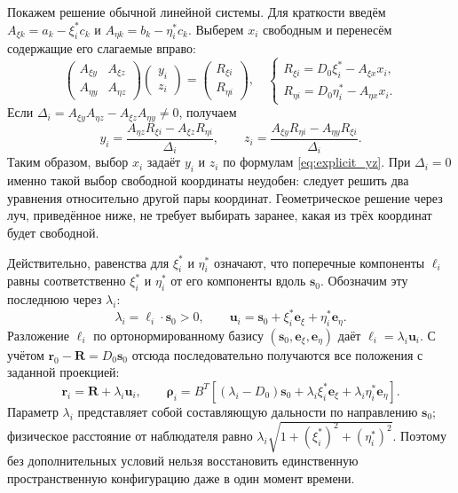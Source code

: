 \documentclass[a4paper,12pt]{article}
\begin{document}
Покажем решение обычной линейной системы. Для краткости введём $A_{\xi k}=a_k-\xi_i^*c_k$ и $A_{\eta k}=b_k-\eta_i^*c_k$. Выберем $x_i$ свободным и перенесём содержащие его слагаемые вправо:
\begin{equation}
    \begin{pmatrix}A_{\xi y}&A_{\xi z}\\
                    A_{\eta y}&A_{\eta z}\end{pmatrix}
    \begin{pmatrix}y_i\\z_i\end{pmatrix}
    =\begin{pmatrix}R_{\xi i}\\R_{\eta i}\end{pmatrix},
    \quad
    \begin{cases}
    R_{\xi i}=D_0\xi_i^*-A_{\xi x}x_i,\\
    R_{\eta i}=D_0\eta_i^*-A_{\eta x}x_i.
    \end{cases}
    \label{eq:two_by_two}
\end{equation}
Если $\Delta_i=A_{\xi y}A_{\eta z}-A_{\xi z}A_{\eta y}\ne0$, получаем
\begin{equation}
    y_i=\frac{A_{\eta z}R_{\xi i}-A_{\xi z}R_{\eta i}}{\Delta_i},
    \qquad
    z_i=\frac{A_{\xi y}R_{\eta i}-A_{\eta y}R_{\xi i}}{\Delta_i}.
    \label{eq:explicit_yz}
\end{equation}
Таким образом, выбор $x_i$ задаёт $y_i$ и $z_i$ по формулам \eqref{eq:explicit_yz}. При $\Delta_i=0$ именно такой выбор свободной координаты неудобен: следует решить два уравнения относительно другой пары координат. Геометрическое решение через луч, приведённое ниже, не требует выбирать заранее, какая из трёх координат будет свободной.

Действительно, равенства для $\xi_i^*$ и $\eta_i^*$ означают, что поперечные компоненты $\boldsymbol\ell_i$ равны соответственно $\xi_i^*$ и $\eta_i^*$ от его компоненты вдоль $\mathbf s_0$. Обозначим эту последнюю через $\lambda_i$:
\begin{equation}
    \lambda_i=\boldsymbol\ell_i\cdot\mathbf s_0>0,
    \qquad
    \mathbf u_i=\mathbf s_0+\xi_i^*\mathbf e_\xi+\eta_i^*\mathbf e_\eta.
\end{equation}
Разложение $\boldsymbol\ell_i$ по ортонормированному базису $(\mathbf s_0,\mathbf e_\xi,\mathbf e_\eta)$ даёт $\boldsymbol\ell_i=\lambda_i\mathbf u_i$. С учётом $\mathbf r_0-\mathbf R=D_0\mathbf s_0$ отсюда последовательно получаются все положения с заданной проекцией:
\begin{equation}
    \mathbf r_i=\mathbf R+\lambda_i\mathbf u_i,
    \qquad
    \boldsymbol\rho_i
    =B^T\left[(\lambda_i-D_0)\mathbf s_0
       +\lambda_i\xi_i^*\mathbf e_\xi
       +\lambda_i\eta_i^*\mathbf e_\eta\right].
    \label{eq:inverse_ray}
\end{equation}
Параметр $\lambda_i$ представляет собой составляющую дальности по направлению $\mathbf s_0$; физическое расстояние от наблюдателя равно $\lambda_i\sqrt{1+(\xi_i^*)^2+(\eta_i^*)^2}$. Поэтому без дополнительных условий нельзя восстановить единственную пространственную конфигурацию даже в один момент времени.
\end{document}
